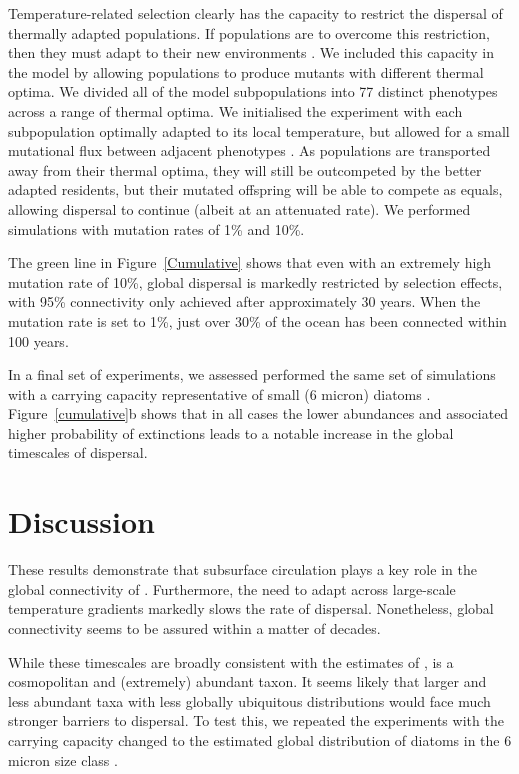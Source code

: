 \documentclass[12pt]{article}
\begin{document}
Temperature-related selection clearly has the capacity to restrict the dispersal of thermally adapted populations. If populations are to overcome this restriction, then they must adapt to their new environments \citep{Thomas:2012,ODonnell:2018}. We included this capacity in the model by allowing populations to produce mutants with different thermal optima. We divided all of the model subpopulations into 77 distinct phenotypes across a range of thermal optima. We initialised the experiment with each subpopulation optimally adapted to its local temperature, but allowed for a small mutational flux between adjacent phenotypes \citep{Sauterey:2017,Beckman:2019}. As populations are transported away from their thermal optima, they will still be outcompeted by the better adapted residents, but their mutated offspring will be able to compete as equals, allowing dispersal to continue (albeit at an attenuated rate). We performed simulations with mutation rates of 1\% and 10\%.

The green line in Figure~\ref{Cumulative} shows that even with an extremely high mutation rate of 10\%, global dispersal is markedly restricted by selection effects, with 95\% connectivity only achieved after approximately 30 years. When the mutation rate is set to 1\%, just over 30\% of the ocean has been connected within 100 years.

In a final set of experiments, we assessed performed the same set of simulations with a carrying capacity representative of small (6 micron) diatoms \citep{Dutkiewicz:2019}. Figure~\ref{cumulative}b shows that in all cases the lower abundances and associated higher probability of extinctions leads to a notable increase in the global timescales of dispersal. 

\section{Discussion}

These results demonstrate that subsurface circulation plays a key role in the global connectivity of \citep{Prochlorococcus}. Furthermore, the need to adapt across large-scale temperature gradients markedly slows the rate of dispersal. Nonetheless, global connectivity seems to be assured within a matter of decades. 

While these timescales are broadly consistent with the estimates of \citet{Jonsson:2016}, \citep{Prochlorococcus} is a cosmopolitan and (extremely) abundant taxon. It seems likely that larger and less abundant taxa with less globally ubiquitous distributions would face much stronger barriers to dispersal. To test this, we repeated the experiments with the carrying capacity changed to the estimated global distribution of diatoms in the 6 micron size class \citep{Dutkiewicz:2019}.
\end{document}
